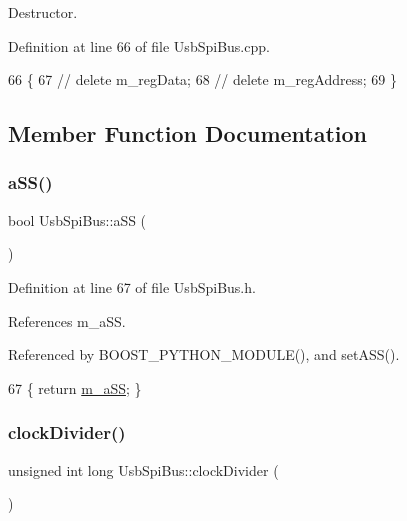 Destructor. 



Definition at line 66 of file Usb\+Spi\+Bus.\+cpp.


\begin{DoxyCode}
66                       \{
67 \textcolor{comment}{//  delete m\_regData;}
68 \textcolor{comment}{//  delete m\_regAddress;}
69 \}
\end{DoxyCode}


\subsection{Member Function Documentation}
\mbox{\label{classUsbSpiBus_afd9b0823f348dddc7fed8ae97d248e9c}} 
\subsubsection{\texorpdfstring{a\+S\+S()}{aSS()}}
{\footnotesize\ttfamily bool Usb\+Spi\+Bus\+::a\+SS (\begin{DoxyParamCaption}{ }\end{DoxyParamCaption})\hspace{0.3cm}{\ttfamily [inline]}}



Definition at line 67 of file Usb\+Spi\+Bus.\+h.



References m\+\_\+a\+SS.



Referenced by B\+O\+O\+S\+T\+\_\+\+P\+Y\+T\+H\+O\+N\+\_\+\+M\+O\+D\+U\+L\+E(), and set\+A\+S\+S().


\begin{DoxyCode}
67 \{ \textcolor{keywordflow}{return} \hyperlink{classUsbSpiBus_ac98d088ac8aed042f65cbd918fc538ae}{m\_aSS}; \}
\end{DoxyCode}
\mbox{\label{classUsbSpiBus_aa7a56b8aedb646ba46408cb5016dde1c}} 
\subsubsection{\texorpdfstring{clock\+Divider()}{clockDivider()}}
{\footnotesize\ttfamily unsigned int long Usb\+Spi\+Bus\+::clock\+Divider (\begin{DoxyParamCaption}{ }\end{DoxyParamCaption})}



